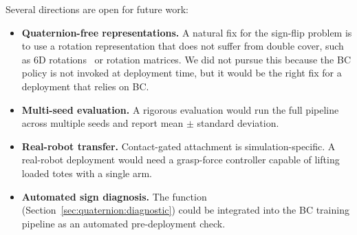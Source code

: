 Several directions are open for future work:
\begin{itemize}[leftmargin=*,itemsep=2pt]
    \item \textbf{Quaternion-free representations.} A natural fix for the sign-flip problem is to use a rotation representation that does not suffer from double cover, such as 6D rotations~\cite{zhou2019continuity} or rotation matrices. We did not pursue this because the BC policy is not invoked at deployment time, but it would be the right fix for a deployment that relies on BC.
    \item \textbf{Multi-seed evaluation.} A rigorous evaluation would run the full pipeline across multiple seeds and report mean $\pm$ standard deviation.
    \item \textbf{Real-robot transfer.} Contact-gated attachment is simulation-specific. A real-robot deployment would need a grasp-force controller capable of lifting loaded totes with a single arm.
    \item \textbf{Automated sign diagnosis.} The  function (Section~\ref{sec:quaternion:diagnostic}) could be integrated into the BC training pipeline as an automated pre-deployment check.
\end{itemize}
